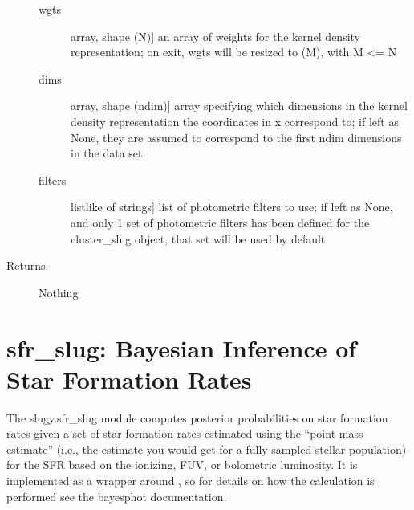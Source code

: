 \documentclass[letterpaper,10pt,english]{sphinxmanual}
\begin{document}
\begin{fulllineitems}
\begin{fulllineitems}
\begin{description}
\begin{description}
\item[{wgts}] \leavevmode{[}array, shape (N){]}
an array of weights for the kernel density
representation; on exit, wgts will be resized to (M),
with M \textless{}= N

\item[{dims}] \leavevmode{[}array, shape (ndim){]}
array specifying which dimensions in the kernel density
representation the coordinates in x correspond to; if
left as None, they are assumed to correspond to the
first ndim dimensions in the data set

\item[{filters}] \leavevmode{[}listlike of strings{]}
list of photometric filters to use; if left as None, and
only 1 set of photometric filters has been defined for
the cluster\_slug object, that set will be used by
default

\end{description}

\item[{Returns:}] \leavevmode
Nothing

\end{description}

\end{fulllineitems}


\end{fulllineitems}



\chapter{sfr\_slug: Bayesian Inference of Star Formation Rates}
\label{\detokenize{sfr_slug:sec-sfr-slug}}\label{\detokenize{sfr_slug:sfr-slug-bayesian-inference-of-star-formation-rates}}\label{\detokenize{sfr_slug::doc}}
The slugy.sfr\_slug module computes posterior probabilities on star formation rates given a set of star formation rates estimated using the “point mass estimate” (i.e., the estimate you would get for a fully sampled stellar population) for the SFR based on the ionizing, FUV, or bolometric luminosity. It is implemented as a wrapper around {\hyperref[\detokenize{bayesphot:sec-bayesphot}]{}}, so for details on how the calculation is performed see the bayesphot documentation.
\end{document}
